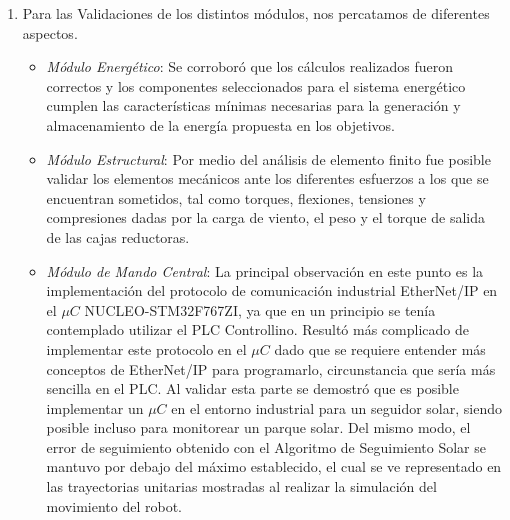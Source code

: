 \begin{enumerate}
\begin{itemize}
    \end{itemize}
    \item Para las Validaciones de los distintos módulos, nos percatamos de diferentes aspectos.
    \begin{itemize}
        \item \textit{Módulo Energético}: Se corroboró que los cálculos realizados fueron correctos y los componentes seleccionados para el sistema energético cumplen las características mínimas necesarias para la generación y almacenamiento de la energía propuesta en los objetivos.
        \item \textit{Módulo Estructural}: Por medio del análisis de elemento finito fue posible validar los elementos mecánicos ante los diferentes esfuerzos a los que se encuentran sometidos, tal como torques, flexiones, tensiones y compresiones dadas por la carga de viento, el peso y el torque de salida de las cajas reductoras.
        \item \textit{Módulo de Mando Central}: La principal observación en este punto es la implementación del protocolo de comunicación industrial EtherNet/IP en el $ \mu C $ NUCLEO-STM32F767ZI, ya que en un principio se tenía contemplado utilizar el PLC Controllino. Resultó más complicado de implementar este protocolo en el $ \mu C $ dado que se requiere entender más conceptos de EtherNet/IP para programarlo, circunstancia que sería más sencilla en el PLC. Al validar esta parte se demostró que es posible implementar un $ \mu C $ en el entorno industrial para un seguidor solar, siendo posible incluso para monitorear un parque solar. Del mismo modo, el error de seguimiento obtenido con el Algoritmo de Seguimiento Solar se mantuvo por debajo del máximo establecido, el cual se ve representado en las trayectorias unitarias mostradas al realizar la simulación del movimiento del robot.
    \end{itemize}
\end{enumerate}

